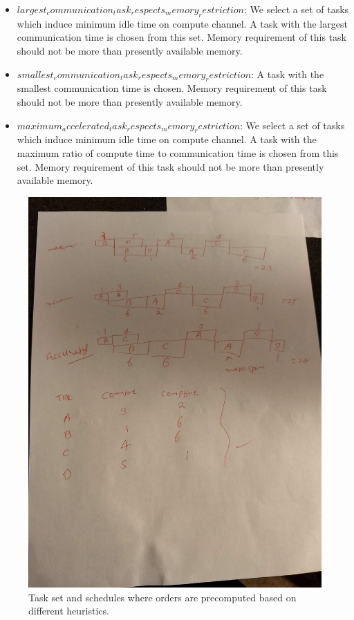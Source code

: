 \documentclass[runningheads]{llncs} %
\begin{document}
\begin{itemize}[a)]
	\item $largest_communication_task_respects_memory_restriction$:  We select a set of tasks which induce minimum idle time on compute channel. A task with the largest communication time is chosen from this set.  Memory requirement of this task should not be more than presently available memory. 
	\item $smallest_communication_task_respects_memory_restriction$: A task with the smallest communication time is chosen.  Memory requirement of this task should not be more than presently available memory. 
	\item $maximum_accelerated_task_respects_memory_restriction$:  We select a set of tasks which induce minimum idle time on compute channel. A task with the maximum ratio of compute time to communication time  is chosen from this set.  Memory requirement of this task should not  be more than presently available memory.
	
\end{itemize}

\begin{figure}[htb]

\includegraphics[scale=0.05]{Figs/dynamiSelectionSchedules}
\caption{Task set and schedules where orders are precomputed based on different heuristics.}
\label{fig:dynamicSelectionExample}
\end{figure}
\end{document}
